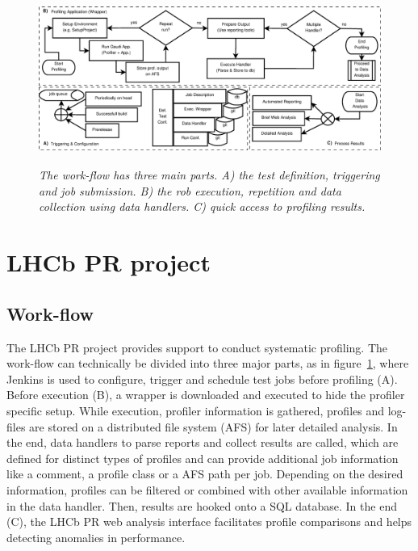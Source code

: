 \documentclass[a4paper]{jpconf}
\begin{document}
\begin{figure}
\includegraphics[width=\textwidth, height=5.6cm]{figures/profiling_process.eps}
\caption{\small \textit{The work-flow has three main parts. A) the test definition, triggering and job submission. B) the rob execution, repetition and data collection using data handlers. C) quick access to profiling results.}}
\label{fig:profiling_process}
\end{figure}

\section{LHCb PR project}
\label{sec:lhcbpr}

\subsection{Work-flow}
\label{sec:workflow}

The LHCb PR project provides support to conduct systematic profiling. The work-flow can technically be divided into three major parts, as in \mbox{figure \ref{fig:profiling_process}}, where Jenkins is used to configure, trigger and schedule test jobs before profiling (A). Before execution (B), a wrapper is downloaded and executed to hide the profiler specific setup. While execution, profiler information is gathered, profiles and log-files are stored on a distributed file system (AFS) for later detailed analysis. In the end, data handlers to parse reports and collect results are called, which are defined for distinct types of profiles and can provide additional job information like a comment, a profile class or a AFS path per job. Depending on the desired information, profiles can be filtered or combined with other available information in the data handler. Then, results are hooked onto a SQL database. In the end (C), the LHCb PR web analysis interface facilitates profile comparisons and helps detecting anomalies in performance.
\end{document}
